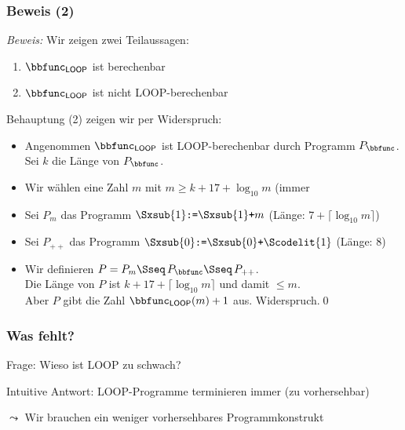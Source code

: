 \documentclass[aspectratio=1610,onlymath]{beamer}
\begin{document}
\begin{frame}[t]\frametitle{Beweis (2)}


\emph{Beweis:} Wir zeigen zwei Teilaussagen:

\begin{enumerate}[(1)]
\item $\bbfunc_{\textsf{LOOP}}$ ist berechenbar
\item $\bbfunc_{\textsf{LOOP}}$ ist nicht LOOP-berechenbar
\end{enumerate}\pause

Behauptung (2) zeigen wir per Widerspruch:\pause
\begin{itemize}
\item Angenommen $\bbfunc_{\textsf{LOOP}}$ ist LOOP-berechenbar durch Programm $P_{\bbfunc}$. Sei $k$ die Länge von $P_{\bbfunc}$.\pause
\item Wir wählen eine Zahl $m$ mit $m\geq k+17+\log_{10} m$ (immer \pause
\item Sei $P_m$ das Programm $\Sxsub{1}\texttt{:=}\Sxsub{1}\texttt{+}m$ (Länge: $7+\lceil\log_{10}m\rceil$)\pause
\item Sei $P_{++}$ das Programm $\Sxsub{0}\texttt{:=}\Sxsub{0}\texttt{+}\Scodelit{1}$ (Länge: $8$)\pause
\item Wir definieren $P = P_m\Sseq\, P_{\bbfunc}\Sseq\, P_{++}$.\\\pause
Die Länge von $P$ ist $k+17+\lceil\log_{10}m\rceil$ und damit $\leq m$.\\\pause
Aber $P$ gibt die Zahl $\bbfunc_{\textsf{LOOP}}(m)+1$ aus. 
Widerspruch.\qed
\end{itemize}

\end{frame}


\begin{frame}\frametitle{Was fehlt?}

\alert{Frage:} Wieso ist LOOP zu schwach?\medskip\pause

\alert{Intuitive Antwort:} LOOP-Programme terminieren immer (zu vorhersehbar)
\bigskip

$\leadsto$ Wir brauchen ein weniger vorhersehbares Programmkonstrukt

\end{frame}
\end{document}
